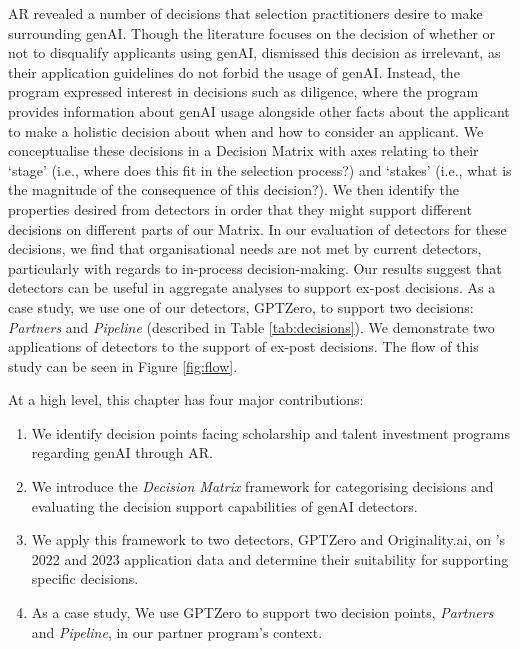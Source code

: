 AR revealed a number of decisions that selection practitioners desire to make surrounding genAI. Though the literature focuses on the decision of whether or not to disqualify applicants using genAI, \rise dismissed this decision as irrelevant, as their application guidelines do not forbid the usage of genAI. Instead, the program expressed interest in decisions such as diligence, where the program provides information about genAI usage alongside other facts about the applicant to make a holistic decision about when and how to consider an applicant. We conceptualise these decisions in a Decision Matrix with axes relating to their `stage' (i.e., where does this fit in the selection process?) and `stakes' (i.e., what is the magnitude of the consequence of this decision?). We then identify the properties desired from detectors in order that they might support different decisions on different parts of our Matrix. In our evaluation of detectors for these decisions, we find that organisational needs are not met by current detectors, particularly with regards to in-process decision-making. Our results suggest that detectors can be useful in aggregate analyses to support ex-post decisions. As a case study, we use one of our detectors, GPTZero, to support two decisions: \emph{Partners} and \emph{Pipeline} (described in Table \ref{tab:decisions}). We demonstrate two applications of detectors to the support of ex-post decisions. The flow of this study can be seen in Figure \ref{fig:flow}.

At a high level, this chapter has four major contributions:

\begin{enumerate}
    \item We identify decision points facing scholarship and talent investment programs regarding genAI through AR.
    \item We introduce the \emph{Decision Matrix} framework for categorising decisions and evaluating the decision support capabilities of genAI detectors.
    \item We apply this framework to two detectors, GPTZero and Originality.ai, on \rise's 2022 and 2023 application data and determine their suitability for supporting specific decisions.
    \item As a case study, We use GPTZero to support two decision points, \emph{Partners} and \emph{Pipeline}, in our partner program's context.
\end{enumerate}

